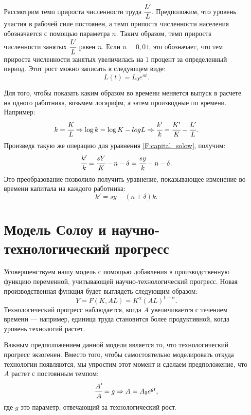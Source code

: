 Рассмотрим темп прироста численности труда $\cfrac{L'}{L}$.
Предположим, что уровень участия в рабочей силе постоянен, а темп припоста численности населения обозначается с помощью параметра $n$.
Таким образом, темп прироста численности занятых $\cfrac{L'}{L}$ равен $n$.
Если $n = 0,01$, это обозначает, что тем прироста численности занятых увеличилась на 1 процент за определенный период.
Этот рост можно записать в следующем виде:
\begin{equation*}
	L(t) = L_{0}e^{nt}\text{.}
\end{equation*}

Для того, чтобы показать каким образом во времени меняется выпуск в расчете на одного работника, возьмем логарифм, а затем производные по времени.
Например:
\begin{equation*}
	k = \cfrac{K}{L}\Rightarrow \log{k}=\log{K} - log{L} \Rightarrow \cfrac{k'}{k} = \cfrac{K'}{K} - \cfrac{L'}{L}\text{.}
\end{equation*}
Произведя такую же операцию для уравнения \ref{F:capital_solow}, получим:
\begin{equation*}
\cfrac{k'}{k} = \cfrac{sY}{K} - n - \delta = \cfrac{sy}{k} - n - \delta\text{.}
\end{equation*}
Это преобразование позволило получить уравнение, показывающее изменение во времени капитала на каждого работника:
\begin{equation*}
k'=sy-(n + \delta)k\text{.}
\end{equation*}

\section{Модель Солоу и научно-технологический прогресс}

Усовершенствуем нашу модель с помощью добавления в производственную функцию переменной, учитывающей научно-технологический прогресс.
Новая производственная функция будет выглядеть следующим образом:
\begin{equation}
	Y=F(K,AL)=K^{\alpha}(AL)^{1 - \alpha}\text{.}
\end{equation}\label{F:Cob_dogl_tech}
Технологический прогресс наблюдается, когда $A$ увеличивается с течением времени --- например, единица труда становится более продуктивной, когда уровень технологий растет.

Важным предположением данной модели является то, что технологический прогресс экзогенен.
Вместо того, чтобы самостоятельно моделировать откуда технологии появляются, мы упростим этот момент и сделаем предположение, что $A$ растет с постоянным темпом:
\begin{equation*}
	\cfrac{A'}{A} = g \Rightarrow A = A_{0} e^{gt}\text{,}
\end{equation*}
где $g$ это параметр, отвечающий за технологический рост.


